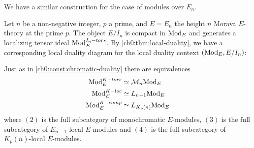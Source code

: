 We have a similar construction for the case of modules over $E_n$. 

\begin{construction}
    \label{ch0:const:chromatic-duality-modules}
    Let $n$ be a non-negative integer, $p$ a prime, and $E = E_n$ the height $n$ Morava $E$-theory at the prime $p$. The object $E/I_n$ is compact in $\mathrm{Mod}_{E}$ and generates a localizing tensor ideal $\mathrm{Mod}_{E}^{I_n-tors}$. By \cref{ch0:thm:local-duality}, we have a corresponding local duality diagram for the local duality context $(\mathrm{Mod}_{E}, E/I_n)$:
    \begin{center}
    \end{center}
    Just as in \cref{ch0:const:chromatic-duality} there are equivalences 
    \begin{align}
        \mathrm{Mod}_{E}^{K-tors}&\simeq \mathcal{M}_n\mathrm{Mod}_{E}\\ 
        \mathrm{Mod}_{E}^{K-loc}&\simeq L_{n-1}\mathrm{Mod}_{E}\\
        \mathrm{Mod}_{E}^{K-comp}&\simeq L_{K_p(n)}\mathrm{Mod}_{E}
    \end{align}
    where $(2)$ is the full subcategory of monochromatic $E$-modules, $(3)$ is the full subcategory of $E_{n-1}$-local $E$-modules and $(4)$ is the full subcategory of $K_p(n)$-local $E$-modules. 
\end{construction}

